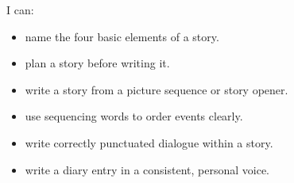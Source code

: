 \begin{selfcheck}
I can:
\begin{itemize}
    \item name the four basic elements of a story.
    \item plan a story before writing it.
    \item write a story from a picture sequence or story opener.
    \item use sequencing words to order events clearly.
    \item write correctly punctuated dialogue within a story.
    \item write a diary entry in a consistent, personal voice.
\end{itemize}
\end{selfcheck}